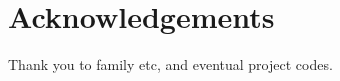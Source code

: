 ~\vfill{}

\section*{Acknowledgements}

Thank you to family etc, and eventual project codes.

\vspace{2.5cm}

\newpage{}
